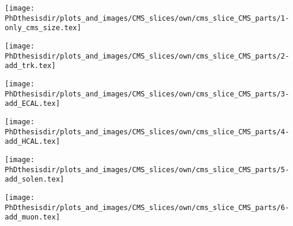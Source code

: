 \begin{frame}
\transdissolve
{}
\end{frame}

\begin{frame}
\transwipe
{}
\begin{center}
\texttt{[image: \\PhDthesisdir/plots\_and\_images/CMS\_slices/own/cms\_slice\_CMS\_parts/1-only\_cms\_size.tex]}
\end{center}
\end{frame}

\begin{frame}
\addtocounter{framenumber}{-1}
\transdissolve
{}
\begin{center}
\texttt{[image: \\PhDthesisdir/plots\_and\_images/CMS\_slices/own/cms\_slice\_CMS\_parts/2-add\_trk.tex]}
\end{center}
\end{frame}

\begin{frame}
\addtocounter{framenumber}{-1}
\transdissolve
{}
\begin{center}
\texttt{[image: \\PhDthesisdir/plots\_and\_images/CMS\_slices/own/cms\_slice\_CMS\_parts/3-add\_ECAL.tex]}
\end{center}
\end{frame}

\begin{frame}
\addtocounter{framenumber}{-1}
\transdissolve
{}
\begin{center}
\texttt{[image: \\PhDthesisdir/plots\_and\_images/CMS\_slices/own/cms\_slice\_CMS\_parts/4-add\_HCAL.tex]}
\end{center}
\end{frame}

\begin{frame}
\addtocounter{framenumber}{-1}
\transdissolve
{}
\begin{center}
\texttt{[image: \\PhDthesisdir/plots\_and\_images/CMS\_slices/own/cms\_slice\_CMS\_parts/5-add\_solen.tex]}
\end{center}
\end{frame}

\begin{frame}
\addtocounter{framenumber}{-1}
\transdissolve
{}
\begin{center}
\texttt{[image: \\PhDthesisdir/plots\_and\_images/CMS\_slices/own/cms\_slice\_CMS\_parts/6-add\_muon.tex]}
\end{center}
\end{frame}

